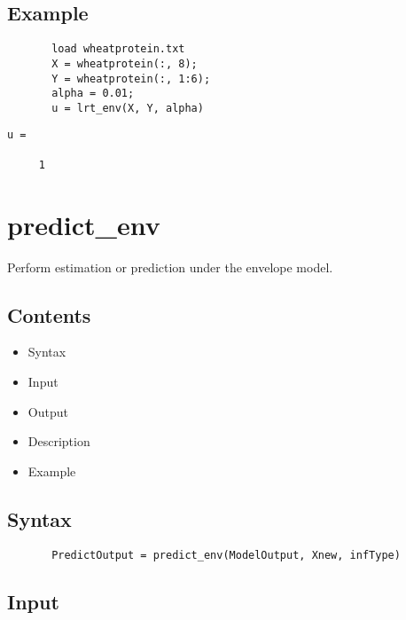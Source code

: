 \documentclass[a4paper,11pt,openany]{memoir}
\begin{document}
\subsection*{Example}


\begin{verbatim}       load wheatprotein.txt
       X = wheatprotein(:, 8);
       Y = wheatprotein(:, 1:6);
       alpha = 0.01;
       u = lrt_env(X, Y, alpha)\end{verbatim}
    
        \color{lightgray}\ttfamily \begin{verbatim}
u =

     1

\end{verbatim} \rmfamily
\color{black}
    
\newpage


\rmfamily
\color{black}\section{predict\_env}

\begin{par}
Perform estimation or prediction under the envelope model.
\end{par} \vspace{1em}

\subsection*{Contents}

\begin{itemize}
\setlength{\itemsep}{-1ex}
   \item Syntax
   \item Input
   \item Output
   \item Description
   \item Example
\end{itemize}


\subsection*{Syntax}


\begin{verbatim}       PredictOutput = predict_env(ModelOutput, Xnew, infType)\end{verbatim}
    

\subsection*{Input}
\end{document}
